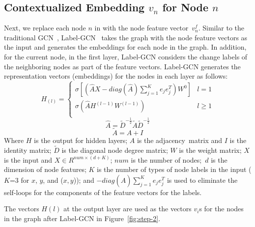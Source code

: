\subsection{Contextualized Embedding $v_n$ for Node $n$}
\label{label-gcn-compute}

Next, we replace each node $n$ in {\mvpdgxy} with the node feature
vector~$v^{f}_n$.
Similar to the traditional GCN~\cite{gcn}, Label-GCN~\cite{label-gcn}
takes the graph with the node feature vectors as the input and
generates the embeddings for each node in the graph. In addition, for
the current node, in the first layer, Label-GCN considers the change
labels of the neighboring nodes as part of the feature vectors.
Label-GCN generates the representation vectors (embeddings) for the nodes in each
layer as follows:
\begin{equation}\label{eq1}
	H_{(l)} = 
	\begin{cases}
		\sigma [(\hat{A}X-diag(\hat{A})\sum_{j=1}^{K}e_je^T_j)W^0] &  l = 1\\
		\sigma (\hat{A}H^{(l-1)}W^{(l-1)}) &  l \geq 1\\
	\end{cases}
\end{equation}
\begin{equation}\label{eq2}
	\hat{A} = \tilde{D}^{-\frac{1}{2}}\tilde{A}\tilde{D}^{-\frac{1}{2}}
\end{equation}
\begin{equation}\label{eq3}
	\tilde{A} = A + I
\end{equation}
Where $H$ is the output for hidden layers; $A$ is the
adjacency~matrix and $I$ is the identity matrix; $\tilde{D}$ is the diagonal node degree matrix; $W$
is the weight matrix; $X$ is the input and $X \in R^{num \times (d+K)}$;
$num$ is the number of nodes;~$d$ is the dimension of node features;
$K$ is the number of types of node labels in the input ($K$=3 for $x$,
$y$, and ($x,y$)); and $-diag(\hat{A})\sum_{j=1}^{K}e_je^T_j$ is used
to eliminate the self-loops for the components of the feature vectors
for the labels.

The vectors $H(l)$ at the output layer are used as the vectors $v_i$s
for the nodes in the {\mvpdgxy} graph after Label-GCN in Figure~\ref{fig:step-2}.



